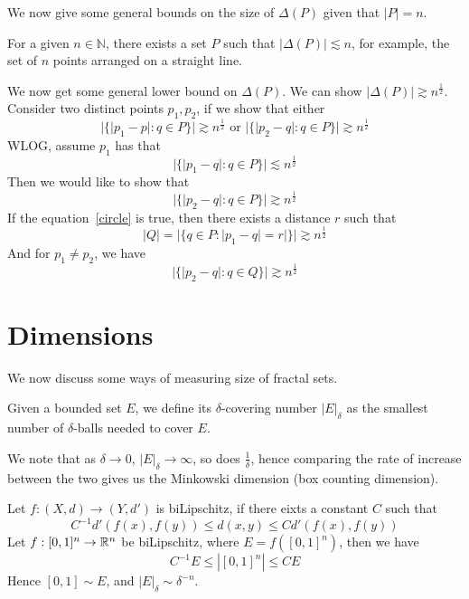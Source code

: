 We now give some general bounds on the size of $\Delta(P)$ given that $|P|=n$.
\begin{exercise}
    For a given $n\in\mathbb{N}$, there exists a set $P$ such that $|\Delta(P)|\lesssim n$, for example, the set of $n$ points arranged on a straight line.
\end{exercise}
\begin{exercise}
    We now get some general lower bound on $\Delta(P)$. We can show $|\Delta(P)|\gtrsim n^\frac{1}{2}$. Consider two distinct points $p_1, p_2$, if we show that either
    \begin{equation*}
        |\{|p_1-p|:q\in P\}|\gtrsim n^\frac{1}{2} \text{ or } |\{|p_2-q|: q\in P\}|\gtrsim n^\frac{1}{2}
    \end{equation*}
    WLOG, assume $p_1$ has that
    \begin{equation}\label{circle}
        |\{|p_1-q|: q\in P\}|\lesssim n^\frac{1}{2}
    \end{equation}
    Then we would like to show that
    \begin{equation*}
        |\{|p_2-q|: q\in P\}|\gtrsim n^\frac{1}{2}
    \end{equation*}
    If the equation~\ref{circle} is true, then there exists a distance $r$ such that 
    \begin{equation*}
        |Q|=|\{q\in P:|p_1-q|=r|\}|\gtrsim n^\frac{1}{2}
    \end{equation*}
    And for $p_1\neq p_2$, we have
    \begin{equation*}
        |\{|p_2-q|:q\in Q\}|\gtrsim n^\frac{1}{2}
    \end{equation*}
\end{exercise}

\chapter{Dimensions}
We now discuss some ways of measuring size of fractal sets.
\begin{definition}
    Given a bounded set $E$, we define its $\delta$-covering number $|E|_\delta$ as the smallest number of $\delta$-balls needed to cover $E$.
\end{definition}
We note that as $\delta\to 0$, $|E|_\delta\to\infty$, so does $\frac{1}{\delta}$, hence comparing the rate of increase between the two gives us the Minkowski dimension (box counting dimension).
\begin{example}
    Let $f: (X,d)\to (Y, d')$ is biLipschitz, if there eixts a constant $C$ such that 
    \begin{equation*}
        C^{-1}d'(f(x), f(y))\leq d(x,y)\leq Cd'(f(x), f(y))
    \end{equation*}
    Let $f:[0,1]^n\to\mathbb{R}^n$ be biLipschitz, where $E=f([0,1]^n)$, then we have
    \begin{equation*}
        C^{-1}E\leq |[0,1]^n|\leq CE
    \end{equation*}
    Hence $[0,1]\sim E$, and $|E|_\delta\sim\delta^{-n}$.
\end{example}

